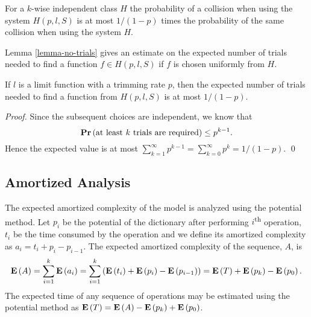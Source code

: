 For a $k$-wise independent class $H$ the probability of a collision when using the system $H(p, l, S)$ is at most $1 / (1 - p)$ times the probability of the same collision when using the system $H$.

Lemma \ref{lemma-no-trials} gives an estimate on the expected number of trials needed to find a function $f \in H(p, l, S)$ if $f$ is chosen uniformly from $H$.

\begin{lemma}
\label{lemma-no-trials}
If $l$ is a limit function with a trimming rate $p$, then the expected number of trials needed to find a function from $H(p, l, S)$ is at most ${1}/{(1 - p)}$.
\end{lemma}
\begin{proof}
Since the subsequent choices are independent, we know that \[\mathbf{Pr}\left(\mbox{at least }k\mbox{ trials are required}\right) \leq p^{k - 1}.\]
Hence the expected value is at most $\sum_{k = 1}^{\infty} p^{k - 1} = \sum_{k = 0}^{\infty} p^k = {1}/{(1 - p)}.$
\qed
\end{proof}

\subsection{Amortized Analysis}
The expected amortized complexity of the model is analyzed using the potential method. Let $p_i$ be the potential of the dictionary after performing $i$\textsuperscript{th} operation, $t_i$ be the time consumed by the operation and we define its amortized complexity as $a_i = t_i + p_i - p_{i - 1}$. The expected amortized complexity of the sequence, $A$, is
\[
\mathbf{E}\left(A\right) = \sum_{i=1}^{k} \mathbf{E}\left(a_i\right) = \sum_{i = 1}^{k} \left(\mathbf{E}\left(t_i\right) + \mathbf{E}\left(p_i\right) - \mathbf{E}\left(p_{i - 1}\right)\right) = \mathbf{E}\left(T\right) + \mathbf{E}\left(p_k\right) - \mathbf{E}\left(p_0\right).
\]
The expected time of any sequence of operations may be estimated using the potential method as $\mathbf{E}\left(T\right) = \mathbf{E}\left(A\right) - \mathbf{E}\left(p_k\right) + \mathbf{E}\left(p_0\right)$.

